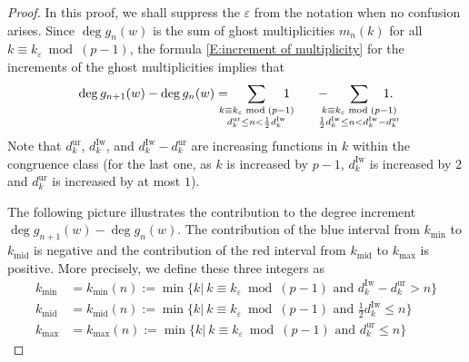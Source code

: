 \documentclass[12pt]{amsart}
\theoremstyle{definition}
\numberwithin{equation}{subsection}
\newcommand{\Iw}{\mathrm{Iw}}
\newcommand{\unr}{\mathrm{ur}}
\newcommand{\ur}{\mathrm{ur}}
\newcommand{\midd}{\mathrm{mid}}
\begin{document}
\begin{proof}
In this proof, we shall suppress the $\varepsilon$ from the notation when no confusion arises.
Since $\deg g_n(w)$ is the sum of ghost multiplicities $m_n(k)$ for all $k \equiv k_\varepsilon \bmod{(p-1)}$, the formula \eqref{E:increment of multiplicity} for the increments of the ghost multiplicities implies that
\begin{equation}
\label{E:gn+1 - gn}
\deg g_{n+1} (w) - \deg g_n(w) = \hspace{-10pt}
\sum_{\substack{k \equiv k_\varepsilon \bmod{(p-1)}
\\
d_{k}^\unr \leq n < \frac 12 d_{k}^\Iw}}
\hspace{-10pt}1\qquad -  \hspace{-10pt} \sum_{\substack{k \equiv k_\varepsilon \bmod{(p-1)}
\\
\frac 12 d_{k}^\Iw\leq n < d_{k}^{\Iw} - d_{k}^\unr }}
\hspace{-15pt}1.
\end{equation}
Note that $d_{k}^\unr$, $d_{k}^\Iw$, and $ d_{k}^{\Iw} - d_{k}^\unr$ are increasing functions in $k$ within the congruence class (for the last one, as $k$ is increased by $p-1$, $d_{k}^\Iw$ is increased by $2$ and $d_{k}^\unr$ is increased by at most $1$).

The following picture illustrates the contribution to the degree increment $\deg g_{n+1}(w) -\deg g_n(w)$. The contribution of the blue interval from $k_{\min}$ to $k_\midd$ is negative and the contribution of the red interval from $k_\midd$ to $k_{\max}$ is positive. More precisely, we define these three integers as
\begin{align}\label{E:first definition of extremal ks}
k_{\min}&=k_{\min}(n):=\min\{k|~k\equiv k_\varepsilon \bmod (p-1) \text{~and~} d_k^\Iw-d_k^\ur>n \}\\
k_{\midd}&=k_{\midd}(n):=\min\{k|~k\equiv k_\varepsilon \bmod (p-1) \text{~and~} \frac 12 d_k^\Iw\leq n \}\nonumber\\
k_{\max}&=k_{\max}(n):=\min\{k|~k\equiv k_\varepsilon \bmod (p-1) \text{~and~} d_k^\ur\leq n \}\nonumber
\end{align}



\end{proof}
\end{document}
